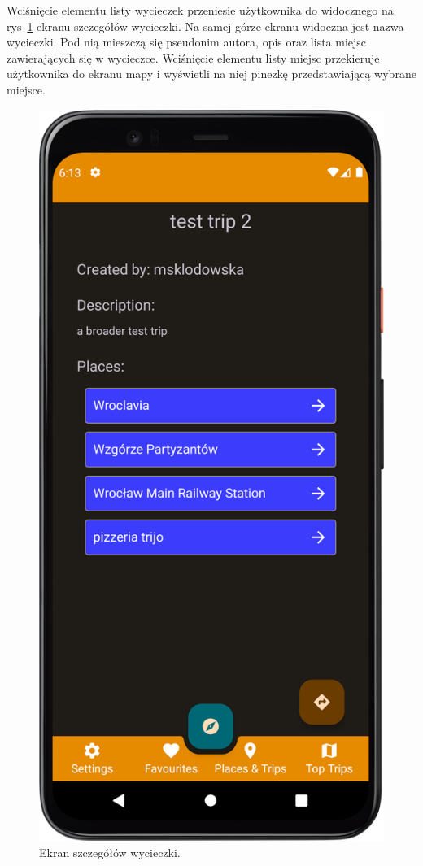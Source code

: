         Wciśnięcie elementu listy wycieczek przeniesie użytkownika do widocznego na rys~\ref{trip_det} ekranu szczegółów wycieczki. Na samej górze ekranu widoczna jest nazwa wycieczki.
        Pod nią mieszczą się pseudonim autora, opis oraz lista miejsc zawierających się w wycieczce. Wciśnięcie elementu listy miejsc przekieruje użytkownika do ekranu mapy i wyświetli na niej
        pinezkę przedstawiającą wybrane miejsce.

        \begin{figure}[H]
            \centering
            \includegraphics[scale=0.10]{src/app/trip.png}
            \caption{Ekran szczegółów wycieczki.\label{trip_det}}
            \qquad
        \end{figure} 

